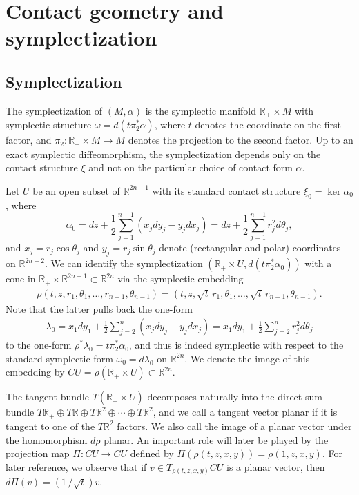 \documentclass{amsart}
\theoremstyle{remark}
\def\R{{\mathbb R}}
\begin{document}
\section{Contact geometry and symplectization} \label{sec:contact}

\subsection{Symplectization} \label{subsec:symplectization}
The symplectization of $(M, \alpha)$ is the symplectic manifold $\R_+ \times M$ with symplectic structure $\omega = d (t \pi_2^* \alpha)$, where $t$ denotes the coordinate on the first factor, and $\pi_2 \colon \R_+ \times M \to M$ denotes the projection to the second factor.
Up to an exact symplectic diffeomorphism, the symplectization depends only on the contact structure $\xi$ and not on the particular choice of contact form $\alpha$.

Let $U$ be an open subset of $\R^{2 n - 1}$ with its standard contact structure $\xi_0 = \ker \alpha_0$, where
\[ \alpha_0 = dz + \frac{1}{2} \sum_{j = 1}^{n - 1} (x_j dy_j - y_j dx_j) = dz + \frac{1}{2} \sum_{j = 1}^{n - 1} r_j^2 d\theta_j, \]
and $x_j = r_j \cos \theta_j$ and $y_j = r_j \sin \theta_j$ denote (rectangular and polar) coordinates on $\R^{2 n - 2}$.
We can identify the symplectization $(\R_+ \times U, d (t \pi_2^* \alpha_0))$ with a cone in $\R_+ \times \R^{2 n - 1} \subset \R^{2 n}$ via the symplectic embedding
\begin{align} \label{eqn:rho}
\rho (t, z, r_1, \theta_1, \ldots, r_{n - 1}, \theta_{n - 1}) = (t, z, \sqrt{t} \, r_1, \theta_1, \ldots, \sqrt{t} \, r_{n - 1}, \theta_{n - 1}) .
\end{align}
Note that the latter pulls back the one-form
\begin{align} \label{eqn:lambda}
\lambda_0 = x_1 dy_1 + \frac{1}{2} \sum_{j = 2}^n (x_j dy_j - y_j dx_j) = x_1 dy_1 + \frac{1}{2} \sum_{j = 2}^n r_j^2 d\theta_j
\end{align}
to the one-form $\rho^* \lambda_0 = t \pi_2^* \alpha_0$, and thus is indeed symplectic with respect to the standard symplectic form $\omega_0 = d\lambda_0$ on $\R^{2 n}$.
We denote the image of this embedding by $CU = \rho (\R_+ \times U) \subset \R^{2 n}$.

The tangent bundle $T (\R_+ \times U)$ decomposes naturally into the direct sum bundle $T\R_+ \oplus T\R \oplus T\R^2 \oplus \cdots \oplus T\R^2$, and we call a tangent vector planar if it is tangent to one of the $T\R^2$ factors.
We also call the image of a planar vector under the homomorphism $d\rho$ planar.
An important role will later be played by the projection map $\Pi \colon CU \to CU$ defined by $\Pi (\rho (t, z, x, y)) = \rho (1, z, x, y)$.
For later reference, we observe that if $v \in T_{\rho (t, z, x, y)} CU$ is a planar vector, then $d\Pi (v) = (1 \, / \sqrt{t}) v$.
\end{document}
